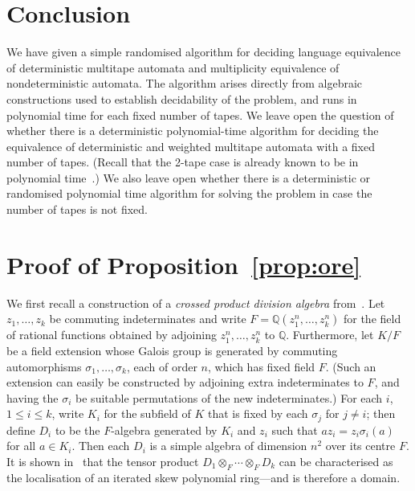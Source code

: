 \documentclass[runningheads]{llncs}
\begin{document}
\section{Conclusion}
We have given a simple randomised algorithm for deciding language
equivalence of deterministic multitape automata and multiplicity
equivalence of nondeterministic automata.  The algorithm arises
directly from algebraic constructions used to establish decidability
of the problem, and runs in polynomial time for each fixed number of
tapes.  We leave open the question of whether there is a deterministic
polynomial-time algorithm for deciding the equivalence of
deterministic and weighted multitape automata with a fixed number of
tapes.  (Recall that the 2-tape case is already known to be in
polynomial time~\cite{FriedmanG82}.)  We also leave open whether there
is a deterministic or randomised polynomial time algorithm for solving
the problem in case the number of tapes is not fixed.






\appendix
\section{Proof of Proposition~\ref{prop:ore}}
\label{sec:appendix}
We first recall a construction of a \emph{crossed product division
  algebra} from~\cite[Proposition 1.1]{Saltman}.  Let $z_1,\ldots,z_k$
be commuting indeterminates and write
$F=\mathbb{Q}(z^n_1,\ldots,z^n_k)$ for the field of rational functions
obtained by adjoining $z^n_1,\ldots,z^n_k$ to $\mathbb{Q}$.
Furthermore, let $K/F$ be a field extension whose Galois group is
generated by commuting automorphisms $\sigma_1,\ldots,\sigma_k$, each
of order $n$, which has fixed field $F$.  (Such an extension can easily
be constructed by adjoining extra indeterminates to $F$, and having
the $\sigma_i$ be suitable permutations of the new indeterminates.)
For each $i$, $1 \leq i \leq k$, write $K_i$ for the subfield of $K$
that is fixed by each $\sigma_j$ for $j\neq i$; then define $D_i$ to
be the $F$-algebra generated by $K_i$ and $z_i$ such that $az_i =
z_i\sigma_i(a)$ for all $a \in K_i$.  Then each $D_i$ is a simple
algebra of dimension $n^2$ over its centre $F$.  It is shown
in~\cite[Proposition 1.1]{Saltman} that the tensor product $D_1
\otimes_F \cdots \otimes_F D_k$ can be characterised as the
localisation of an iterated skew polynomial ring---and is therefore a
domain.
\end{document}
